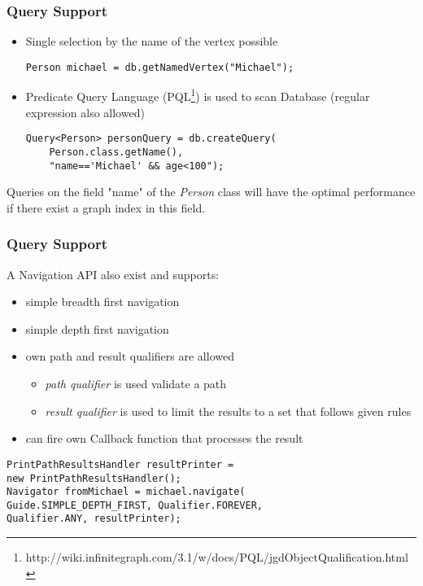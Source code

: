 
\begin{frame}[fragile]
\frametitle{Query Support}
\begin{itemize}
\item Single selection by the name of the vertex possible
\begin{lstlisting}[caption=(Point query)]
Person michael = db.getNamedVertex("Michael");
\end{lstlisting}
\item Predicate Query Language (PQL\footnote{http://wiki.infinitegraph.com/3.1/w/docs/PQL/jgdObjectQualification.html}) is used to scan Database (regular expression also allowed)
\begin{lstlisting}[caption=(Range query)]
Query<Person> personQuery = db.createQuery(
	Person.class.getName(), 
	"name=='Michael' && age<100");
\end{lstlisting}
\end{itemize}
Queries on the field "name" of the \textit{Person} class will have the optimal performance if there exist a graph index in this field. 

\end{frame} 

\begin{frame}[fragile]
\frametitle{Query Support}
A Navigation API also exist and supports:
\begin{itemize}
\item simple breadth first navigation
\item simple depth first navigation
\item own path and result qualifiers are allowed
\begin{itemize}
\item \textit{path qualifier} is used validate a path
\item \textit{result qualifier} is used to limit the results to a set that follows given rules
\end{itemize}
\item can fire own Callback function that processes the result
\end{itemize}
\begin{lstlisting}[caption=(Creating a simple Navigator)]
PrintPathResultsHandler resultPrinter = 
new PrintPathResultsHandler();
Navigator fromMichael = michael.navigate(
Guide.SIMPLE_DEPTH_FIRST, Qualifier.FOREVER, 
Qualifier.ANY, resultPrinter);
\end{lstlisting}
\end{frame} 

